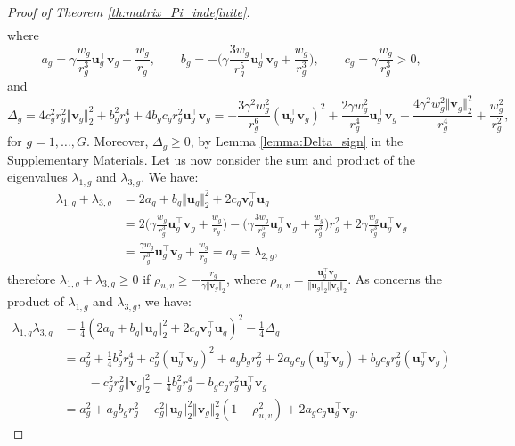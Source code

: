 \documentclass[a4paper, 12pt]{article}
\newcommand{\T}{\top}
\def\bu{\boldsymbol{u}}
\def\bv{\boldsymbol{v}}
\def\bu{\mathbf{u}}
\def\bv{\mathbf{v}}
\begin{document}
\begin{appendix}
\begin{proof}[Proof of Theorem \ref{th:matrix_Pi_indefinite}]
\begin{align*}
\end{align*}
where
\begin{equation}
\label{eq:abc_definition}
a_g=\gamma\frac{w_g}{r_g^3}\bu_g^{\T}\bv_g+\frac{w_g}{r_g},\qquad
b_g=-\Big(\gamma\frac{3w_g}{r_g^5}\bu_g^{\T}\bv_g+\frac{w_g}{r_g^3}\Big),\qquad
c_g=\gamma\frac{w_g}{r_g^3}>0,
\end{equation}
and
\begin{equation}
\label{eq:Pi_eigen_Delta}
\Delta_g=4c_g^2r_g^2\Vert\bv_g\Vert_2^2+b_g^2r_g^4+4b_gc_gr_g^2\bu_g^{\T}\bv_g=-\frac{3\gamma^2w_g^2}{r_g^6}(\bu_g^{\T}\bv_g)^2+\frac{2\gamma w_g^2}{r_g^4}\bu_g^{\T}\bv_g+\frac{4\gamma^2 w_g^2\Vert\bv_g\Vert_2^2}{r_g^4}+\frac{w_g^2}{r_g^2},
\end{equation}
for $g=1,\dots,G$. Moreover, $\Delta_g\geq0$, by Lemma \ref{lemma:Delta_sign} in the Supplementary Materials. Let us now consider the sum and product of the eigenvalues $\lambda_{1,g}$ and $\lambda_{3,g}$. We have:
\begin{equation}
\label{eq:lambda1_plus_lambda3_is_lambda2}
\begin{aligned}
\lambda_{1,g}+\lambda_{3,g}&=2 a_g+b_g \Vert\bu_g\Vert_2^2+2 c_g \bv_g^{\T}\bu_g\\
&=2\Big(\gamma\frac{w_g}{r_g^3}\bu_g^{\T}\bv_g+\frac{w_g}{r_g}\Big)-\Big(\gamma\frac{3w_g}{r_g^5}\bu_g^{\T}\bv_g+\frac{w_g}{r_g^3}\Big)r_g^2+2\gamma\frac{w_g}{r_g^3}\bu_g^{\T}\bv_g\\
&=\frac{\gamma w_g}{r_g^3}\bu_g^{\T}\bv_g+\frac{w_g}{r_g}=a_g=\lambda_{2,g},
\end{aligned}
\end{equation}
therefore $\lambda_{1,g}+\lambda_{3,g}\geq0$ if $\rho_{u,v}\geq-\frac{r_g}{\gamma\Vert\bv_g\Vert_2}$, where $\rho_{u,v}=\frac{\bu_g^{\T}\bv_g}{\Vert\bu_g\Vert_2\Vert\bv_g\Vert_2}$. As concerns the product of $\lambda_{1,g}$ and $\lambda_{3,g}$, we have:
\begin{equation*}
\begin{aligned}
\lambda_{1,g}\lambda_{3,g}&=\frac{1}{4}(2 a_g+b_g \Vert\bu_g\Vert_2^2+2 c_g \bv_g^{\T}\bu_g)^2 - \frac{1}{4}\Delta_g\\
&=a_g^2+\frac{1}{4}b_g^2r_g^4+c_g^2(\bu_g^{\T}\bv_g)^2+a_gb_gr_g^2+2a_gc_g(\bu_g^{\T}\bv_g)+b_gc_gr_g^2(\bu_g^{\T}\bv_g)\\
&\qquad-c_g^2r_g^2\Vert\bv_g\vert_2^2-\frac{1}{4}b_g^2r_g^4-b_gc_gr_g^2\bu_g^{\T}\bv_g\\
&= a_g^2+a_gb_gr_g^2-c_g^2\Vert\bu_g\Vert_2^2\Vert\bv_g\Vert_2^2(1-\rho_{u,v}^2)+2a_gc_g\bu_g^{\T}\bv_g.
\end{aligned}

\end{equation*}
\end{proof}
\end{appendix}
\end{document}
